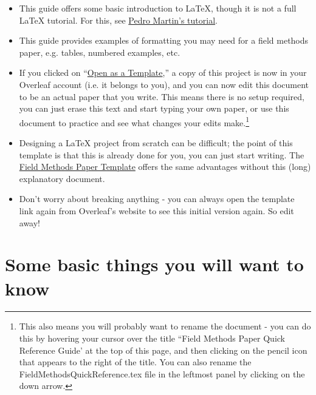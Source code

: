 \documentclass[output=paper,colorlinks,citecolor=brown]{langscibook}
\begin{document}
\begin{itemize}

\item This guide offers some basic introduction to \LaTeX{}, though it is not a full \LaTeX{} tutorial. For this, see \href{http://ptmartins.info/latex/}{Pedro Martin's tutorial}.

\item This guide provides examples of formatting you may need for a field methods paper, e.g. tables, numbered examples, etc. 

\item If you clicked on ``\href{https://www.overleaf.com/latex/templates/field-methods-papers-quick-reference-guide/cqbjxwnffvrm}{Open as a Template},'' a copy of this project is now in your Overleaf account (i.e. it belongs to you), and you can now edit this document to be an actual paper that you write. This means there is no setup required, you can just erase this text and start typing your own paper, or use this document to practice and see what changes your edits make.\footnote{This also means you will probably want to rename the document - you can do this by hovering your cursor over the title ``Field Methods Paper Quick Reference Guide' at the top of this page, and then clicking on the pencil icon that appears to the right of the title. You can also rename the FieldMethodsQuickReference.tex file in the leftmost panel by clicking on the down arrow.} 

\item Designing a \LaTeX{} project from scratch can be difficult; the point of this template is that this is already done for you, you can just start writing. The \href{https://www.overleaf.com/latex/templates/field-methods-paper-template/pqrxmrsptqcv}{Field Methods Paper Template} offers the same advantages without this (long) explanatory document.

\item Don't worry about breaking anything - you can always open the template link again from Overleaf's website to see this initial version again. So edit away!


\end{itemize}

\section{Some basic things you will want to know}
\end{document}
